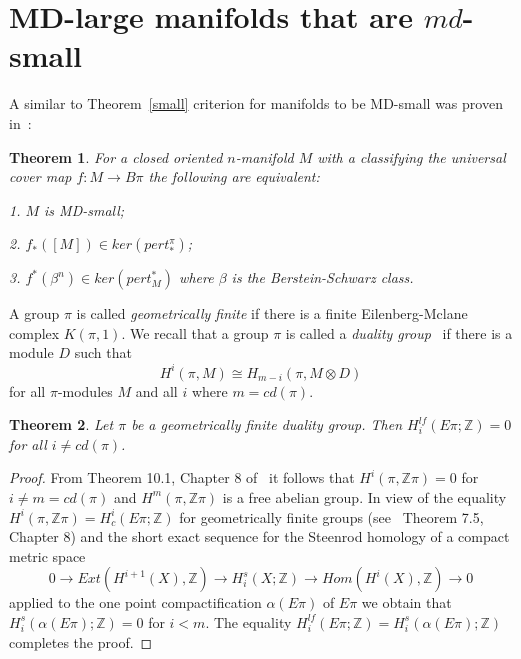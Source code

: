 \documentclass[12pt]{amsart}
\theoremstyle{plain}
\newtheorem{thm}{Theorem}[section]
\theoremstyle{definition}
\begin{document}
\section{MD-large manifolds that are $md$-small}

A similar to Theorem~\ref{small} criterion for manifolds to be MD-small  was proven in~\cite{Dr}:
\begin{thm}\label{Small}
For a closed oriented $n$-manifold $M$ with a classifying the universal cover map $f:M\to B\pi$ the following are equivalent:

1. $M$ is MD-small;

2. $f_*([M])\in ker(pert_*^{\pi})$;

3. $f^*(\beta^n)\in ker(pert^*_M)$ where $\beta$ is the Berstein-Schwarz class.
\end{thm}
A group $\pi$ is called {\em geometrically finite} if there is a finite Eilenberg-Mclane complex $K(\pi,1)$.
We recall that a group $\pi$ is called a {\em duality group}~\cite{Br} 
if there is a module $D$ such that
$$
H^i(\pi,M)\cong H_{m-i}(\pi,M\otimes D)
$$
for all $\pi$-modules $M$ and all $i$ where $m=cd(\pi)$.

\begin{thm}\label{duality}
Let $\pi$ be a geometrically finite duality group. Then $H^{lf}_i(E\pi;\mathbb Z)=0$ for all $i\ne cd(\pi)$.
\end{thm}
\begin{proof} 
From Theorem 10.1, Chapter 8 of~\cite{Br} it follows that $H^i(\pi,\mathbb Z\pi)=0$ for $i\ne m= cd(\pi)$ and
$H^m(\pi,\mathbb Z\pi)$ is a free abelian group. In view of the equality $H^i(\pi,\mathbb Z\pi)=H_c^i(E\pi;\mathbb Z)$
for geometrically finite groups
(see~\cite{Br} Theorem 7.5, Chapter 8) and the short exact sequence for the Steenrod homology of a compact metric space
$$
0\to Ext(H^{i+1}(X),\mathbb Z)\to H^s_i(X;\mathbb Z)\to Hom(H^i(X),\mathbb Z)\to 0
$$
applied to the one point compactification $\alpha(E\pi)$ of $E\pi$ we obtain that $H^s_i(\alpha(E\pi);\mathbb Z)=0$ for
$i< m$. The equality $H^{lf}_i(E\pi;\mathbb Z)=H^s_i(\alpha(E\pi);\mathbb Z)$ completes the proof.
\end{proof}
\end{document}
